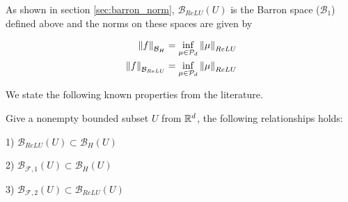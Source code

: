 As shown in section \ref{sec:barron_norm}, $\mathcal{B}_{ReLU}(U)$ is the Barron
space ($\mathcal{B}_1$) defined above and the norms on these spaces are given by 

\begin{align*}
    \left\| f \right\|_{\mathcal{B}_H} &= \inf_{\mu \in \mathcal{P}_d} \left\| \mu \right\|_{ReLU} \\
    \left\| f \right\|_{\mathcal{B}_{ReLU}} &= \inf_{\mu \in \mathcal{P}_d} \left\| \mu \right\|_{ReLU}
\end{align*}

We state the following known properties from the literature.

\begin{lemma}
    Give a nonempty bounded subset $U$ from $\mathbb{R}^d$, the following relationships holds:

    1) $\mathcal{B}_{ReLU}(U) \subset \mathcal{B}_{H}(U)$

    2) $\mathcal{B}_{\mathcal{F}, 1}(U) \subset \mathcal{B}_H(U)$

    3) $\mathcal{B}_{\mathcal{F}, 2}(U) \subset \mathcal{B}_{ReLU}(U)$
\end{lemma}


